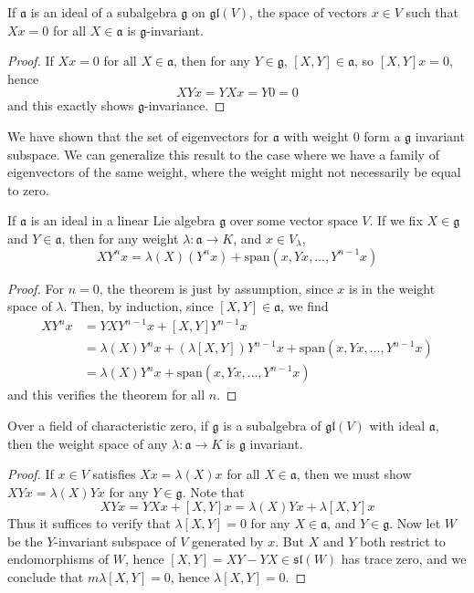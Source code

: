 \begin{lemma}
    If $\mathfrak{a}$ is an ideal of a subalgebra $\mathfrak{g}$ on $\mathfrak{gl}(V)$, the space of vectors $x \in V$ such that $Xx = 0$ for all $X \in \mathfrak{a}$ is $\mathfrak{g}$-invariant.
\end{lemma}
\begin{proof}
    If $Xx = 0$ for all $X \in \mathfrak{a}$, then for any $Y \in \mathfrak{g}$, $[X,Y] \in \mathfrak{a}$, so $[X,Y]x = 0$, hence
    \[ XYx = YXx = Y0 = 0 \]
    and this exactly shows $\mathfrak{g}$-invariance.
\end{proof}

We have shown that the set of eigenvectors for $\mathfrak{a}$ with weight 0 form a $\mathfrak{g}$ invariant subspace. We can generalize this result to the case where we have a family of eigenvectors of the same weight, where the weight might not necessarily be equal to zero.

\begin{lemma}
    If $\mathfrak{a}$ is an ideal in a linear Lie algebra $\mathfrak{g}$ over some vector space $V$. If we fix $X \in \mathfrak{g}$ and $Y \in \mathfrak{a}$, then for any weight $\lambda: \mathfrak{a} \to K$, and $x \in V_\lambda$,
    \[ XY^nx = \lambda(X)(Y^n x) + \text{span}(x,Yx, \dots, Y^{n-1}x) \]
\end{lemma}
\begin{proof}
    For $n = 0$, the theorem is just by assumption, since $x$ is in the weight space of $\lambda$. Then, by induction, since $[X,Y] \in \mathfrak{a}$, we find
    \begin{align*}
        XY^nx &= YXY^{n-1}x + [X,Y]Y^{n-1}x\\
        &= \lambda(X)Y^nx + \left( \lambda [X,Y] \right) Y^{n-1} x + \text{span}(x,Yx,\dots,Y^{n-1}x)\\
        &= \lambda(X)Y^nx + \text{span}(x,Yx,\dots,Y^{n-1}x)
    \end{align*}
    and this verifies the theorem for all $n$.
\end{proof}

\begin{theorem}
    Over a field of characteristic zero, if $\mathfrak{g}$ is a subalgebra of $\mathfrak{gl}(V)$ with ideal $\mathfrak{a}$, then the weight space of any $\lambda: \mathfrak{a} \to K$ is $\mathfrak{g}$ invariant.
\end{theorem}
\begin{proof}
    If $x \in V$ satisfies $Xx = \lambda(X)x$ for all $X \in \mathfrak{a}$, then we must show $XYx = \lambda(X)Yx$ for any $Y \in \mathfrak{g}$. Note that
    \[ XYx = YXx + [X,Y]x = \lambda(X) Yx + \lambda[X,Y]x \]
    Thus it suffices to verify that $\lambda[X,Y] = 0$ for any $X \in \mathfrak{a}$, and $Y \in \mathfrak{g}$. Now let $W$ be the $Y$-invariant subspace of $V$ generated by $x$. But $X$ and $Y$ both restrict to endomorphisms of $W$, hence $[X,Y] = XY - YX \in \mathfrak{sl}(W)$ has trace zero, and we conclude that $m \lambda[X,Y] = 0$, hence $\lambda [X,Y] = 0$.
\end{proof}

